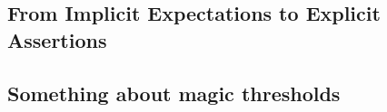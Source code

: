 \documentclass[acmsmall,screen,review,anonymous]{acmart}
\begin{document}




\subsection{From Implicit Expectations to Explicit Assertions}




\subsection{Something about magic thresholds}\label{sec:magic-threshold}


\end{document}
